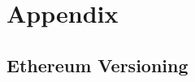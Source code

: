 \section{Appendix}

\listoflistings

\listoffigures

\listoftables

\subsection{Ethereum Versioning}


